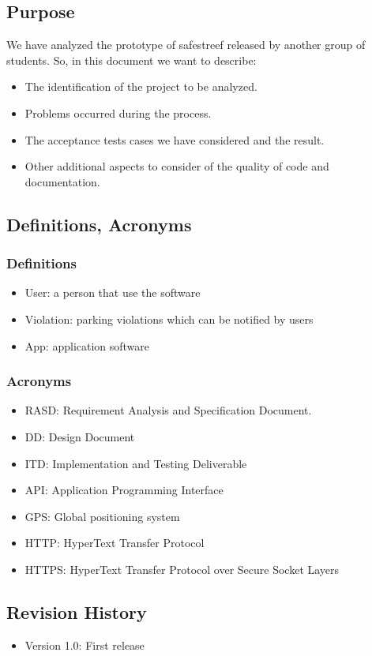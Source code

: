
\subsection{Purpose}
We have analyzed the prototype of safestreef released by another group of students. So, in this document we want to describe:
\begin{itemize}
\item	The identification of the project to be analyzed.
\item	Problems occurred during the process.
\item	The acceptance tests cases we have considered and the result. 
\item	Other additional aspects to consider of the quality of code and documentation.
\end{itemize}

\subsection{Definitions, Acronyms}
\subsubsection {Definitions}
\begin{itemize}
\item     User: a person that use the software
\item	Violation: parking violations which can be notified by users
\item	App: application software 
\end{itemize}
	\subsubsection {Acronyms}
\begin{itemize}
\item	RASD: Requirement Analysis and Specification Document.
\item      DD: Design Document
\item      ITD: Implementation and Testing Deliverable
\item	API: Application Programming Interface
\item	GPS: Global positioning system
\item	HTTP: HyperText Transfer Protocol
\item	HTTPS: HyperText Transfer Protocol over Secure Socket Layers

\end{itemize}
\subsection {Revision History}
\begin{itemize}
\item	Version 1.0: First release
\end{itemize}

